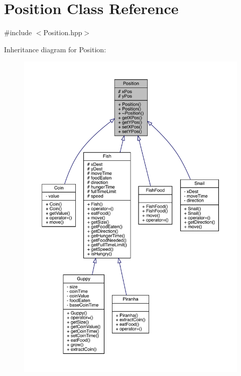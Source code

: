 \hypertarget{class_position}{}\section{Position Class Reference}
\label{class_position}


{\ttfamily \#include $<$Position.\+hpp$>$}



Inheritance diagram for Position\+:
\nopagebreak
\begin{figure}[H]
\begin{center}
\leavevmode
\includegraphics[width=350pt]{class_position__inherit__graph}
\end{center}
\end{figure}


